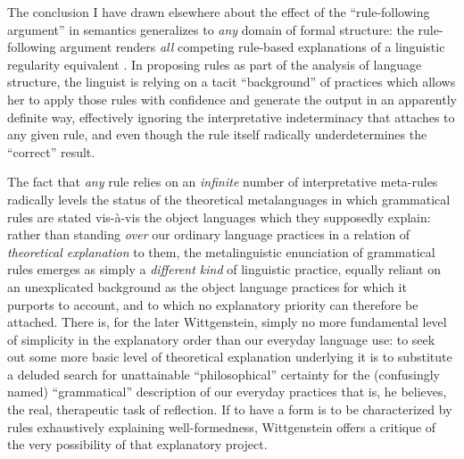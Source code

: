 \documentclass[output=paper]{langscibook}
\begin{document}
The conclusion I have drawn elsewhere about the effect of the ``rule-following argument'' in semantics generalizes to \emph{any} domain of formal structure: the rule-following argument renders \emph{all} competing rule-based explanations of a linguistic regularity equivalent \citep[52]{Riemer2005}. In proposing rules as part of the analysis of language structure, the linguist is relying on a tacit ``background'' of practices which allows her to apply those rules with confidence and generate the output in an apparently definite way, effectively ignoring the interpretative indeterminacy that attaches to any given rule, and even though the rule itself radically underdetermines the ``correct'' result.

The fact that \emph{any} rule relies on an \emph{infinite} number of interpretative meta-rules radically levels the status of the theoretical metalanguages in which grammatical rules are stated vis-à-vis the object languages which they supposedly explain: rather than standing \emph{over} our ordinary language practices in a relation of \emph{theoretical explanation} to them, the metalinguistic enunciation of grammatical rules emerges as simply a \emph{different kind} of linguistic practice, equally reliant on an unexplicated background as the object language practices for which it purports to account, and to which no explanatory priority can therefore be attached. There is, for the later Wittgenstein, simply no more fundamental level of simplicity in the explanatory order than our everyday language use: to seek out some more basic level of theoretical explanation underlying it is to substitute a deluded search for unattainable ``philosophical'' certainty for the (confusingly named) ``grammatical'' description of our everyday practices that is, he believes, the real, therapeutic task of reflection. If to have a form is to be characterized by rules exhaustively explaining well-formedness, Wittgenstein offers a critique of the very possibility of that explanatory project.
\end{document}
